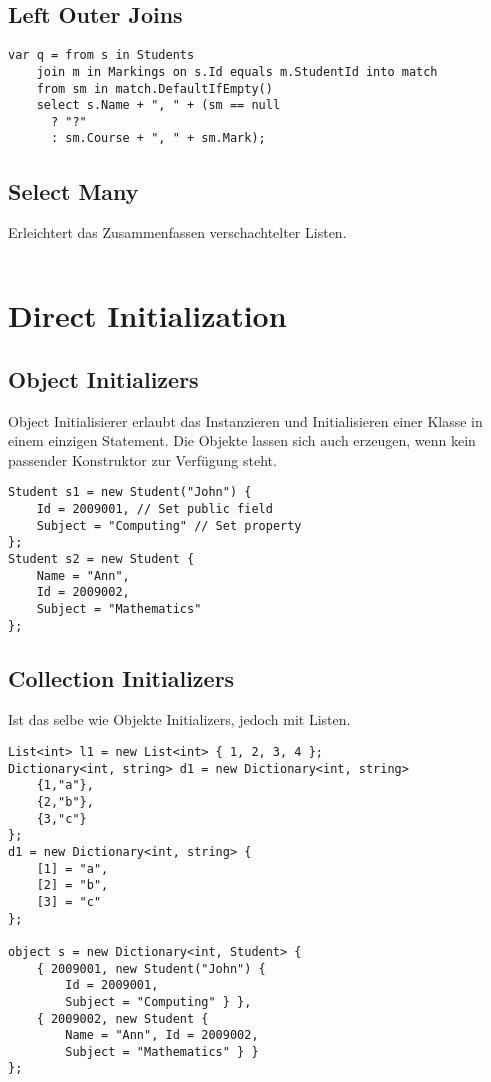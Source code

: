 \subsection{Left Outer Joins}
\begin{lstlisting}
var q = from s in Students
	join m in Markings on s.Id equals m.StudentId into match 
	from sm in match.DefaultIfEmpty()
	select s.Name + ", " + (sm == null
      ? "?"
      : sm.Course + ", " + sm.Mark);	
\end{lstlisting}

\subsection{Select Many}
Erleichtert das Zusammenfassen verschachtelter Listen.
\begin{lstlisting}

\end{lstlisting}

\pagebreak
\section{Direct Initialization}
\subsection{Object Initializers}
Object Initialisierer erlaubt das Instanzieren und Initialisieren einer Klasse in einem einzigen Statement. Die Objekte lassen sich auch erzeugen, wenn kein passender Konstruktor zur Verfügung steht.

\begin{lstlisting}
Student s1 = new Student("John") {
	Id = 2009001, // Set public field 
	Subject = "Computing" // Set property
}; 
Student s2 = new Student {
	Name = "Ann", 
	Id = 2009002, 
	Subject = "Mathematics"
};
\end{lstlisting}


\subsection{Collection Initializers}
Ist das selbe wie Objekte Initializers, jedoch mit Listen.

\begin{lstlisting}
List<int> l1 = new List<int> { 1, 2, 3, 4 }; 
Dictionary<int, string> d1 = new Dictionary<int, string>
	{1,"a"}, 
	{2,"b"}, 
	{3,"c"}
};
d1 = new Dictionary<int, string> { 
	[1] = "a",
	[2] = "b",
	[3] = "c"
};

object s = new Dictionary<int, Student> {
	{ 2009001, new Student("John") { 
		Id = 2009001,
		Subject = "Computing" } },
	{ 2009002, new Student {
    	Name = "Ann", Id = 2009002,
        Subject = "Mathematics" } }
};
\end{lstlisting}

